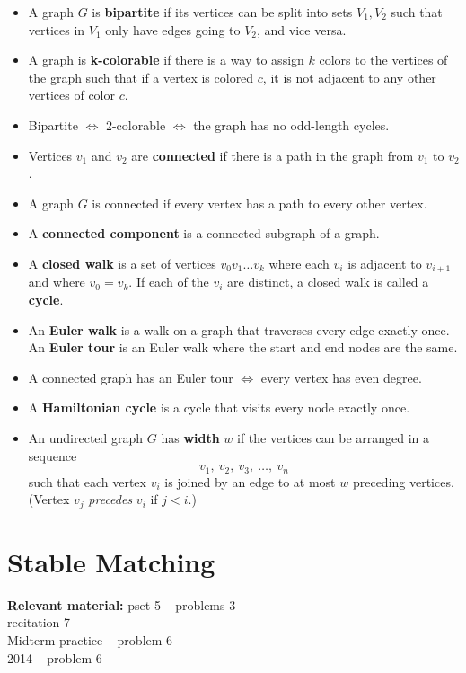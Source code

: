 \documentclass[11pt]{article}
\begin{document}
\begin{itemize}
	\item A graph $G$ is \textbf{bipartite} if its vertices can be split into sets $V_1, V_2$
	such that vertices in $V_1$ only have edges going to $V_2$, and vice versa.
	\item A graph is \textbf{k-colorable} if there is a way to assign $k$ colors to the vertices of the graph such that if a vertex is colored $c$, it is not adjacent to any other vertices of color $c$.
	\item Bipartite $\Leftrightarrow$ 2-colorable $\Leftrightarrow$ the graph has no odd-length cycles.
	\item Vertices $v_1$ and $v_2$ are \textbf{connected} if there is a path in the graph
	from $v_1$ to $v_2$.
	\item A graph $G$ is connected if every vertex has a path to every other vertex.
	\item A \textbf{connected component} is a connected subgraph of a graph.
	\item A \textbf{closed walk} is a set of vertices $v_0v_1\ldots v_k$ where each
	$v_i$ is adjacent to $v_{i+1}$ and where $v_0 = v_k$.  If each of the $v_i$ are
	distinct, a closed walk is called a \textbf{cycle}.
	\item An \textbf{Euler walk} is a walk on a graph that traverses every edge exactly once.  An \textbf{Euler tour} is an Euler walk where the start and end nodes are the same.
	\item A connected graph has an Euler tour $\Leftrightarrow$ every vertex has even
	degree.
	\item A \textbf{Hamiltonian cycle} is a cycle that visits every node exactly once.
	\item An undirected graph $G$ has \textbf{width} $w$ if the vertices can be
arranged in a sequence
%
\[
v_1,\ v_2,\ v_3,\ \ldots,\ v_n
\]
%
such that each vertex $v_i$ is joined by an edge to at most $w$
preceding vertices.  (Vertex $v_j$ \textit{precedes} $v_i$ if $j <
i$.)

\end{itemize}
	
\section{Stable Matching}
\textbf{Relevant material: } pset 5 -- problems 3\\
 recitation 7\\
 Midterm practice -- problem 6\\
 2014 -- problem 6
 
\end{document}
